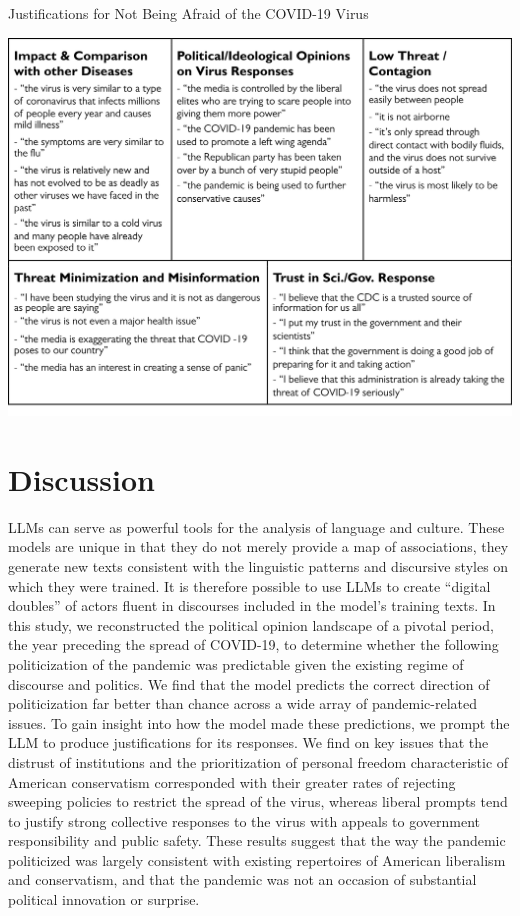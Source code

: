 \documentclass{article}
\let\oldtable\table
\let\endoldtable\endtable
\renewenvironment{table}[1][!htbp]{ 
  \oldtable[#1]
  \footnotesize 
}{
  \endoldtable
}
\begin{document}
\begin{table}
  \caption{Justifications for Not Being Afraid of the COVID-19 Virus}
  \label{tab:notafraid}
  \centering
  \includegraphics[width=\textwidth]{./figures/media/Table6.png}
\end{table}

\section*{Discussion}

LLMs can serve as powerful tools for the analysis of language and
culture. These models are unique in that they do not merely provide a
map of associations, they generate new texts consistent with the
linguistic patterns and discursive styles on which they were trained. It
is therefore possible to use LLMs to create ``digital doubles'' of
actors fluent in discourses included in the model's training texts. In
this study, we reconstructed the political opinion landscape of a
pivotal period, the year preceding the spread of COVID-19, to determine
whether the following politicization of the pandemic was predictable
given the existing regime of discourse and politics. We find that the
model predicts the correct direction of politicization far better than
chance across a wide array of pandemic-related issues. To gain insight
into how the model made these predictions, we prompt the LLM to produce
justifications for its responses. We find on key issues that the
distrust of institutions and the prioritization of personal freedom
characteristic of American conservatism corresponded with their greater
rates of rejecting sweeping policies to restrict the spread of the
virus, whereas liberal prompts tend to justify strong collective
responses to the virus with appeals to government responsibility and
public safety. These results suggest that the way the pandemic
politicized was largely consistent with existing repertoires of American
liberalism and conservatism, and that the pandemic was not an occasion
of substantial political innovation or surprise.
\end{document}
